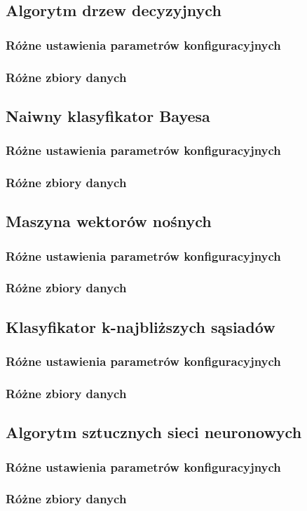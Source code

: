 \documentclass[a4paper,11pt]{article}
\begin{document}
\subsection{Algorytm drzew decyzyjnych}
\subsubsection{Różne ustawienia parametrów konfiguracyjnych}
\subsubsection{Różne zbiory danych}

\subsection{Naiwny klasyfikator Bayesa}
\subsubsection{Różne ustawienia parametrów konfiguracyjnych}
\subsubsection{Różne zbiory danych}

\subsection{Maszyna wektorów nośnych}
\subsubsection{Różne ustawienia parametrów konfiguracyjnych}
\subsubsection{Różne zbiory danych}

\subsection{Klasyfikator k-najbliższych sąsiadów}
\subsubsection{Różne ustawienia parametrów konfiguracyjnych}
\subsubsection{Różne zbiory danych}

\subsection{Algorytm sztucznych sieci neuronowych}
\subsubsection{Różne ustawienia parametrów konfiguracyjnych}
\subsubsection{Różne zbiory danych}
\end{document}
